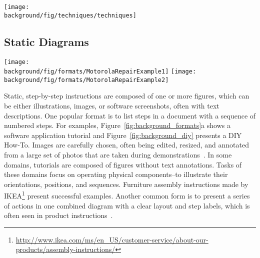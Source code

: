 \clearpage

\begin{table*}[!htbp]
  \centering
  \texttt{[image: \\background/fig/techniques/techniques]}
  \caption{A list of annotation techniques that are often used to provide instructions. Examples are selected from stroller instructions~\cite{MountainBuggyInstructions}. Reproduced with permission.}
  \label{background_annotation_techniques}
\end{table*}

\clearpage


\subsection{Static Diagrams}

\begin{figure*}[b!]
  \centering
  \texttt{[image: \\background/fig/formats/MotorolaRepairExample1]}
  \texttt{[image: \\background/fig/formats/MotorolaRepairExample2]}
  \caption{
    A 5-step static tutorial for a DIY task presented as a web document. Each step includes image(s) and text descriptions. Tutorial by David Hodson~\cite{MotorolaRepairExample}, licensed under CC BY 3.0.
  }
  \label{fig:background_diy}
\end{figure*}

Static, step-by-step instructions are composed of one or more figures, which can be either illustrations, images, or software screenshots, often with text descriptions. One popular format is to list steps in a document with a sequence of numbered steps. For examples, Figure~\ref{fig:background_formats}a shows a software application tutorial and Figure~\ref{fig:background_diy} presents a DIY How-To. Images are carefully chosen, often being edited, resized, and annotated from a large set of photos that are taken during demonstrations~\cite{Tseng:2014:PVP:2598510.2598540}. In some domains, tutorials are composed of figures without text annotations. Tasks of these domains focus on operating physical components--to illustrate their orientations, positions, and sequences. Furniture assembly instructions made by IKEA\footnote{\url{http://www.ikea.com/ms/en_US/customer-service/about-our-products/assembly-instructions/}} present successful examples.
%
Another common form is to present a series of actions in one combined diagram with a clear layout and step labels, which is often seen in product instructions~\cite{mijksenaar1999open}.


